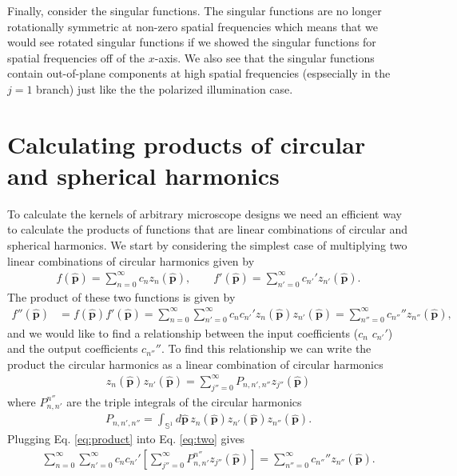 \documentclass[11pt]{article}
\providecommand{\mh}[1]{\mathbf{\hat{#1}}}
\providecommand{\mbb}[1]{\mathbb{#1}}
\begin{document}
Finally, consider the singular functions. The singular functions are no longer
rotationally symmetric at non-zero spatial frequencies which means that we would
see rotated singular functions if we showed the singular functions for spatial
frequencies off of the $x$-axis. We also see that the singular functions contain
out-of-plane components at high spatial frequencies (espsecially in the $j=1$
branch) just like the the polarized illumination case.



{}



\appendix
\section{Calculating products of circular and spherical harmonics}
To calculate the kernels of arbitrary microscope designs we need an efficient
way to calculate the products of functions that are linear combinations of
circular and spherical harmonics. We start by considering the simplest case of
multiplying two linear combinations of circular harmonics given by
\begin{align}
  f(\mh{p}) = \sum_{n=0}^\infty c_nz_n(\mh{p}), \qquad f'(\mh{p}) = \sum_{n'=0}^\infty c_{n'}'z_{n'}(\mh{p}). 
\end{align}
The product of these two functions is given by 
\begin{align}
  f''(\mh{p}) &= f(\mh{p})f'(\mh{p})=\sum_{n=0}^\infty \sum_{n'=0}^\infty c_n c_{n'}' z_n(\mh{p}) z_{n'}(\mh{p}) = \sum_{n''=0}^{\infty} c_{n''}''z_{n''}(\mh{p}), \label{eq:two}
  \end{align}
  and we would like to find a relationship between the input coefficients ($c_n$
  $c_{n'}'$) and the output coefficients $c_{n''}''$. To find this relationship
  we can write the product the circular harmonics as a linear combination of
  circular harmonics
  \begin{align}
    z_n(\mh{p})z_{n'}(\mh{p}) = \sum_{j''=0}^{\infty}P_{n,n',n''}z_{j''}(\mh{p})\label{eq:product}
  \end{align}
  where $P^{n''}_{n,n'}$ are the triple integrals of the circular harmonics
  \begin{align}
    P_{n,n',n''} = \int_{\mbb{S}^1}d\mh{p}\, z_{n}(\mh{p})z_{n'}(\mh{p})z_{n''}(\mh{p}).\label{eq:triple}
  \end{align}
  Plugging Eq. \ref{eq:product} into Eq. \ref{eq:two} gives
  \begin{align}
    \sum_{n=0}^\infty \sum_{n'=0}^\infty c_n c_{n'}' \left[\sum_{j''=0}^{\infty}P^{n''}_{n,n'}z_{j''}(\mh{p})\right] = \sum_{n''=0}^{\infty} c_{n''}''z_{n''}(\mh{p}).    
  \end{align}
\end{document}
